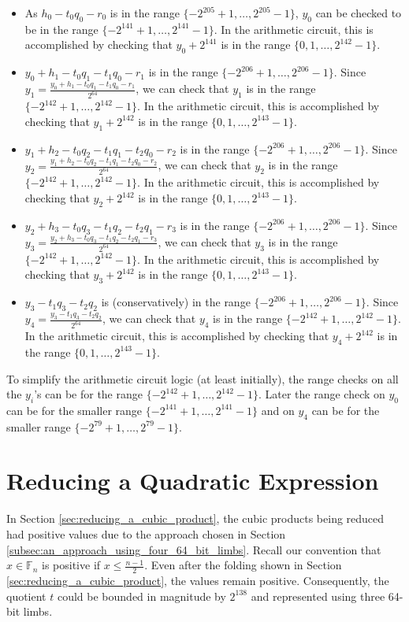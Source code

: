 \documentclass[a4paper, 12pt]{article}
\begin{document}
\begin{itemize}
  \item As $h_0 - t_0q_0-r_0$ is in the range $\{-2^{205}+1,\ldots, 2^{205}-1\}$, $y_0$ can be checked to be in the range $\{-2^{141}+1,\ldots, 2^{141}-1\}$. In the arithmetic circuit, this is accomplished by checking that $y_0 + 2^{141}$ is in the range $\{0,1,\ldots,2^{142}-1\}$.
  \item $y_0+h_1-t_0q_1-t_1q_0-r_1$ is in the range $\{-2^{206}+1,\ldots, 2^{206}-1\}$. Since $y_1 = \frac{y_0+h_1-t_0q_1-t_1q_0-r_1}{2^{64}}$, we can check that $y_1$ is in the range $\{-2^{142}+1,\ldots, 2^{142}-1\}$. In the arithmetic circuit, this is accomplished by checking that $y_1 + 2^{142}$ is in the range $\{0,1,\ldots,2^{143}-1\}$.
  \item $y_1+h_2-t_0q_2-t_1q_1-t_2q_0-r_2$ is in the range $\{-2^{206}+1,\ldots, 2^{206}-1\}$. Since $y_2 = \frac{y_1+h_2-t_0q_2-t_1q_1-t_2q_0-r_2}{2^{64}}$, we can check that $y_2$ is in the range $\{-2^{142}+1,\ldots, 2^{142}-1\}$. In the arithmetic circuit, this is accomplished by checking that $y_2 + 2^{142}$ is in the range $\{0,1,\ldots,2^{143}-1\}$.
  \item $y_2+h_3-t_0q_3-t_1q_2-t_2q_1-r_3$ is in the range $\{-2^{206}+1,\ldots, 2^{206}-1\}$. Since $y_3 = \frac{y_2+h_3-t_0q_3-t_1q_2-t_2q_1-r_3}{2^{64}}$, we can check that $y_3$ is in the range $\{-2^{142}+1,\ldots, 2^{142}-1\}$. In the arithmetic circuit, this is accomplished by checking that $y_3 + 2^{142}$ is in the range $\{0,1,\ldots,2^{143}-1\}$.
  \item $y_3-t_1q_3-t_2q_2$ is (conservatively) in the range $\{-2^{206}+1,\ldots, 2^{206}-1\}$. Since $y_4 = \frac{y_3-t_1q_3-t_2q_2}{2^{64}}$, we can check that $y_4$ is in the range $\{-2^{142}+1,\ldots, 2^{142}-1\}$. In the arithmetic circuit, this is accomplished by checking that $y_4 + 2^{142}$ is in the range $\{0,1,\ldots,2^{143}-1\}$.
\end{itemize}
To simplify the arithmetic circuit logic (at least initially), the range checks on all the $y_i$'s can be for the range $\{-2^{142}+1,\ldots, 2^{142}-1\}$. Later the range check on $y_0$ can be for the smaller range $\{-2^{141}+1,\ldots,2^{141}-1\}$ and on $y_4$ can be for the smaller range $\{-2^{79}+1,\ldots,2^{79}-1\}$.

\section{Reducing a Quadratic Expression}%
\label{sec:reducing_a_quadratic_expression}
In Section \ref{sec:reducing_a_cubic_product}, the cubic products being reduced had positive values due to the approach chosen in Section \ref{subsec:an_approach_using_four_64_bit_limbs}. Recall our convention that $x \in \mathbb{F}_n$ is positive if $x \le \frac{n-1}{2}$. Even after the folding shown in Section \ref{sec:reducing_a_cubic_product}, the values remain positive. Consequently, the quotient $t$ could be bounded in magnitude by $2^{138}$ and represented using three 64-bit limbs.
\end{document}
